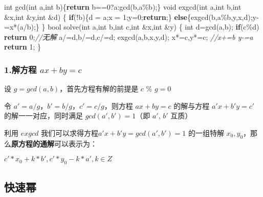 \documentclass[
]{article}
\newenvironment{Shaded}{}{}
\newcommand{\CommentTok}[1]{\textcolor[rgb]{0.38,0.63,0.69}{\textit{#1}}}
\newcommand{\ControlFlowTok}[1]{\textcolor[rgb]{0.00,0.44,0.13}{\textbf{#1}}}
\newcommand{\DataTypeTok}[1]{\textcolor[rgb]{0.56,0.13,0.00}{#1}}
\newcommand{\DecValTok}[1]{\textcolor[rgb]{0.25,0.63,0.44}{#1}}
\newcommand{\NormalTok}[1]{#1}
\begin{document}
\begin{Shaded}
\begin{Highlighting}[]
\DataTypeTok{int}\NormalTok{ gcd(}\DataTypeTok{int}\NormalTok{ a,}\DataTypeTok{int}\NormalTok{ b)\{}\ControlFlowTok{return}\NormalTok{ b==}\DecValTok{0}\NormalTok{?a:gcd(b,a\%b);\}}
\DataTypeTok{void}\NormalTok{ exgcd(}\DataTypeTok{int}\NormalTok{ a,}\DataTypeTok{int}\NormalTok{ b,}\DataTypeTok{int}\NormalTok{ \&x,}\DataTypeTok{int}\NormalTok{ \&y,}\DataTypeTok{int}\NormalTok{ \&d)}
\NormalTok{\{}
    \ControlFlowTok{if}\NormalTok{(!b)\{d = a;x = }\DecValTok{1}\NormalTok{;y=}\DecValTok{0}\NormalTok{;}\ControlFlowTok{return}\NormalTok{;\}}
    \ControlFlowTok{else}\NormalTok{\{exgcd(b,a\%b,y,x,d);y{-}=x*(a/b);\}}
\NormalTok{\}}
\DataTypeTok{bool}\NormalTok{ solve(}\DataTypeTok{int}\NormalTok{ a,}\DataTypeTok{int}\NormalTok{ b,}\DataTypeTok{int}\NormalTok{ c,}\DataTypeTok{int}\NormalTok{ \&x,}\DataTypeTok{int}\NormalTok{ \&y)}
\NormalTok{\{}
    \DataTypeTok{int}\NormalTok{ d=gcd(a,b);}
    \ControlFlowTok{if}\NormalTok{(c\%d) }\ControlFlowTok{return} \DecValTok{0}\NormalTok{;}\CommentTok{//无解}
\NormalTok{    a/=d,b/=d,c/=d;}
\NormalTok{    exgcd(a,b,x,y,d);}
\NormalTok{    x*=c,y*=c;}
    \CommentTok{//x+=b y{-}=a}
    \ControlFlowTok{return} \DecValTok{1}\NormalTok{;}
\NormalTok{\}}
\end{Highlighting}
\end{Shaded}

\hypertarget{ux89e3ux65b9ux7a0b-axbyc}{%
\subsubsection{\texorpdfstring{1.解方程
\(ax+by=c\)}{1.解方程 ax+by=c}}\label{ux89e3ux65b9ux7a0b-axbyc}}

设 \(g=gcd(a, b)\)，首先方程有解的前提是 \({c}\) \% \({g} = 0\)

令 \(a'=a/g\)，\(b'=b/g\)，\(c'=c/g\)，则方程 \(ax+by=c\) 的解与方程
\(a'x+b'y=c'\) 的解一一对应，同时满足 \(gcd(a', b')=1\)（即 \(a'\),
\(b'\) 互质）

利用 \(exgcd\) 我们可以求得方程\(a'x+b'y=gcd(a',b')=1\) 的一组特解
\(x_{0},y_{0}\)，那么\textbf{原方程的通解}可以表示为：

\(c'*x_{0}+k*b',c'*y_{0}-k*a',k\in{Z}\)

\hypertarget{ux5febux901fux5e42}{%
\subsection{快速幂}\label{ux5febux901fux5e42}}
\end{document}
